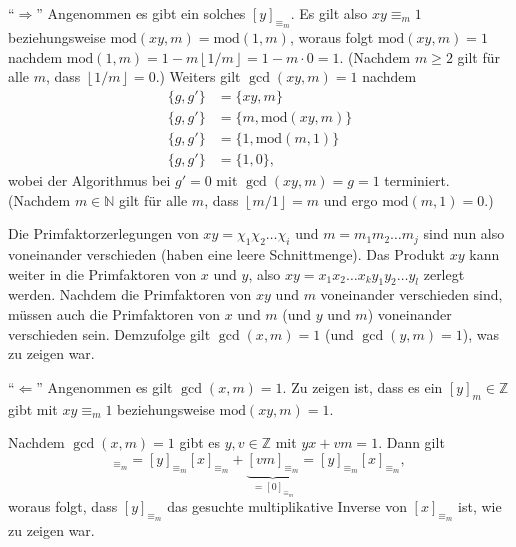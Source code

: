 \documentclass{article}
\newcommand{\cmod}{\text{mod}}
\begin{document}
\enquote{$\Rightarrow$} Angenommen es gibt ein solches $[y]_{\equiv_{m}}$. Es gilt also $xy \equiv_{m} 1$ beziehungsweise $\cmod(xy, m) = \cmod(1, m)$, woraus folgt $\cmod(xy, m) = 1$ nachdem $\cmod(1, m) = 1 - m \left\lfloor{1 / m}\right\rfloor = 1 - m \cdot 0 = 1$. (Nachdem $m \geq 2$ gilt für alle $m$, dass $\left\lfloor{1 / m}\right\rfloor = 0$.) Weiters gilt $\gcd(xy, m) = 1$ nachdem
\begin{align*}
    \{ g, g' \} &= \{ xy, m \}\\
    \{ g, g' \} &= \{ m, \cmod(xy, m) \}\\
    \{ g, g' \} &= \{ 1, \cmod(m, 1) \}\\
    \{ g, g' \} &= \{ 1, 0 \},
\end{align*}
wobei der Algorithmus bei $g' = 0$ mit $\gcd(xy, m) = g = 1$ terminiert. (Nachdem $m \in \mathbb{N}$ gilt für alle $m$, dass $\left\lfloor{m / 1}\right\rfloor = m$ und ergo $\cmod(m, 1) = 0$.)

Die Primfaktorzerlegungen von $xy = \chi_1\chi_2 \ldots \chi_i$ und $m = m_1m_2 \ldots m_j$ sind nun also voneinander verschieden (haben eine leere Schnittmenge). Das Produkt $xy$ kann weiter in die Primfaktoren von $x$ und $y$, also $xy = x_1x_2 \ldots x_k y_1y_2 \ldots y_l$ zerlegt werden. Nachdem die Primfaktoren von $xy$ und $m$ voneinander verschieden sind, müssen auch die Primfaktoren von $x$ und $m$ (und $y$ und $m$) voneinander verschieden sein. Demzufolge gilt $\gcd(x, m) = 1$ (und $\gcd(y, m) = 1$), was zu zeigen war.


\enquote{$\Leftarrow$} Angenommen es gilt $\gcd(x, m) = 1$. Zu zeigen ist, dass es ein $[y]_m \in \mathbb{Z}$ gibt mit $xy \equiv_m 1$ beziehungsweise $\cmod(xy, m) = 1$. 


Nachdem $\gcd(x, m) = 1$ gibt es $y, v \in \mathbb{Z}$ mit $yx + vm = 1$. Dann gilt
\begin{equation*}
    [1]_{\equiv_{m}} = [y]_{\equiv_{m}}[x]_{\equiv_{m}} + \underbrace{[vm]_{\equiv_{m}}}_{= [0]_{\equiv_{m}}} = [y]_{\equiv_{m}}[x]_{\equiv_{m}},
\end{equation*}
woraus folgt, dass $[y]_{\equiv_{m}}$ das gesuchte multiplikative Inverse von $[x]_{\equiv_{m}}$ ist, wie zu zeigen war.
\end{document}
